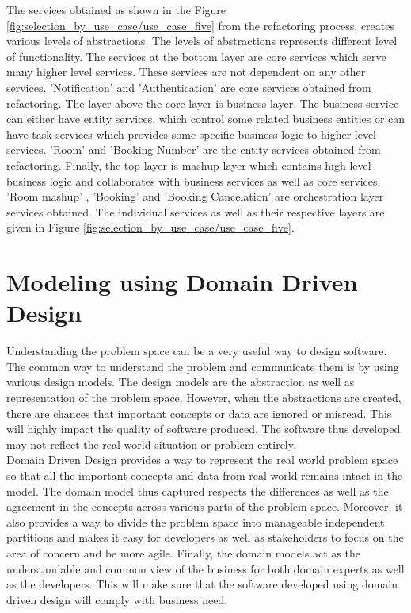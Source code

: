 The services obtained as shown in the Figure \ref{fig:selection_by_use_case/use_case_five} from the refactoring process, creates various levels of abstractions. The levels of abstractions represents different level of functionality. The services at the bottom layer are core services which serve many higher level services. These services are not dependent on any other services. 'Notification' and 'Authentication' are core services obtained from refactoring. The layer above the core layer is business layer. The business service can either have entity services, which control some related business entities or can have task services which provides some specific business logic to higher level services. 'Room' and 'Booking Number' are the entity services obtained from refactoring. Finally, the top layer is mashup layer which contains high level business logic and collaborates with business services as well as core services. 'Room mashup' , 'Booking' and 'Booking Cancelation' are orchestration layer services obtained. The individual services as well as their respective layers are given in Figure \ref{fig:selection_by_use_case/use_case_five}. \cite{Fareghzadeh:2008aa}\cite{Emig:2015aa}\cite{Zimmermann:2005aa}

\section{Modeling using Domain Driven Design}\label{section:domain_driven_design/introduction}
Understanding the problem space can be a very useful way to design software. The common way to understand the problem and communicate them is by using various design models. The design models are the abstraction as well as representation of the problem space. However, when the abstractions are created, there are chances that important concepts or data are ignored or misread. This will highly impact the quality of software produced. The software thus developed may not reflect the real world situation or problem entirely.
\\
Domain Driven Design provides a way to represent the real world problem space so that all the important concepts and data from real world remains intact in the model. The domain model thus captured respects the differences as well as the agreement in the concepts across various parts of the problem space. Moreover, it also provides a way to divide the problem space into manageable independent partitions and makes it easy for developers as well as stakeholders to focus on the area of concern and be more agile. Finally, the domain models act as the understandable and common view of the business for both domain experts as well as the developers. This will make sure that the software developed using domain driven design will comply with business need.\cite{Evans:2003aa}\cite{Vernon:2013aa}
\\

